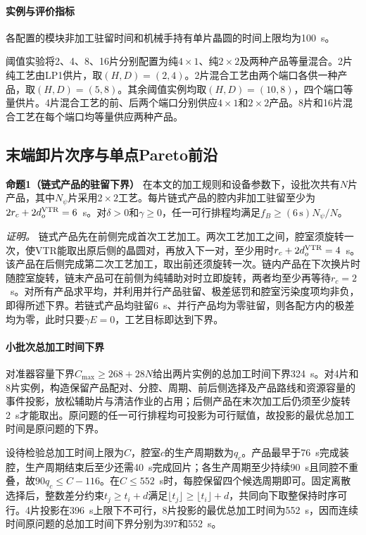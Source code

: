 \documentclass[preprint,12pt,nonatbib]{elsarticle}
\begin{document}
\paragraph{实例与评价指标}
各配置的模块非加工驻留时间和机械手持有单片晶圆的时间上限均为100~s。

阈值实验将2、4、8、16片分别配置为纯$4\times1$、纯$2\times2$及两种产品等量混合。2片纯工艺由LP1供片，取$(H,D)=(2,4)$。2片混合工艺由两个端口各供一种产品，取$(H,D)=(5,8)$。其余阈值实例均取$(H,D)=(10,8)$，四个端口等量供片。4片混合工艺的前、后两个端口分别供应$4\times1$和$2\times2$产品。8片和16片混合工艺在每个端口均等量供应两种产品。

\subsection{末端卸片次序与单点Pareto前沿}
\label{sec:structural-front-cn}

\noindent\textbf{命题1（链式产品的驻留下界）}\quad
在本文的加工规则和设备参数下，设批次共有$N$片产品，其中$N_\psi$片采用$2\times2$工艺。每片链式产品的腔内非加工驻留至少为$2r_c+2d_o^{\rm VTR}=6$~s。对$\delta>0$和$\gamma\ge0$，任一可行排程均满足$f_B\ge(6\,\mathrm{s})N_\psi/N$。

\noindent\textit{证明。}
链式产品先在前侧完成首次工艺加工。两次工艺加工之间，腔室须旋转一次，使VTR能取出原后侧的晶圆对，再放入下一对，至少用时$r_c+2d_o^{\rm VTR}=4$~s。该产品在后侧完成第二次工艺加工，取出前还须旋转一次。链内产品在下次换片时随腔室旋转，链末产品可在前侧为纯辅助对时立即旋转，两者均至少再等待$r_c=2$~s。对所有产品求平均，并利用并行产品驻留、极差惩罚和腔室污染度项均非负，即得所述下界。若链式产品均驻留6~s、并行产品均为零驻留，则各配方内的极差均为零，此时只要$\gamma E=0$，工艺目标即达到下界。

\paragraph{小批次总加工时间下界}
对准器容量下界$C_{\max}\ge268+28N$给出两片实例的总加工时间下界324~s。对4片和8片实例，构造保留产品配对、分腔、周期、前后侧选择及产品路线和资源容量的事件投影，放松辅助片与清洁作业的占用；后侧产品在末次加工后仍须至少旋转2~s才能取出。原问题的任一可行排程均可投影为可行赋值，故投影的最优总加工时间是原问题的下界。

设待检验总加工时间上限为$C$，腔室$c$的生产周期数为$q_c$。产品最早于76~s完成装腔，生产周期结束后至少还需40~s完成回片；各生产周期至少持续90~s且同腔不重叠，故$90q_c\le C-116$。在$C\le552$~s时，每腔保留四个候选周期即可。固定离散选择后，整数差分约束$t_j\ge t_i+d$满足$\lfloor t_j\rfloor\ge\lfloor t_i\rfloor+d$，共同向下取整保持时序可行。4片投影在396~s上限下不可行，8片投影的最优总加工时间为552~s，因而连续时间原问题的总加工时间下界分别为397和552~s。
\end{document}
